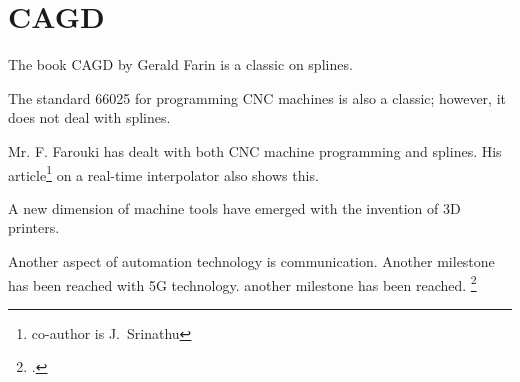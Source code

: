 \begin{comment}
    

\bigskip
$\ldots$

A \ac{sps} is $\ldots$
\bigskip


A \ac{cnc} needs a \ac{sps} \index{
    Programmable Logic Controller} (PLC) \index{PLC|see{
        Programmable Logic Controller}} to $\ldots$


\end{comment}

\chapter{CAGD}

\blindtext

The book CAGD by Gerald Farin is a classic on splines. \cite{Farin:2002}

\bigskip

The standard 66025 for programming CNC machines is also a classic; however, it does not deal with splines. \cite{DIN66025}

\bigskip

Mr. F. Farouki has dealt with both CNC machine programming and splines. His article\footnote{co-author is J.~Srinathu} on a real-time interpolator also shows this. \cite{Farouki:2017}

\bigskip

A new dimension of machine tools have emerged with the invention of 3D printers. \cite{Patent3D}

\bigskip


Another aspect of automation technology is communication. Another milestone has been reached with 5G technology.
another milestone has been reached. \footcite{Zafeiropoulos:2020}

